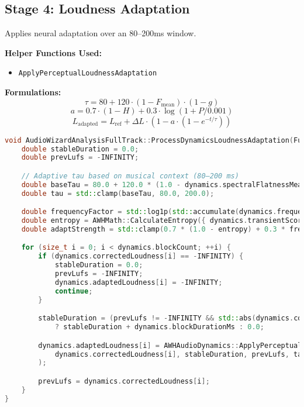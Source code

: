\documentclass[11pt]{article}
\begin{document}
\subsection{Stage 4: Loudness Adaptation}
Applies neural adaptation over an 80--200ms window.

\textbf{Helper Functions Used:}
\begin{itemize}
  \item \texttt{ApplyPerceptualLoudnessAdaptation}
\end{itemize}

\textbf{Formulations:}
\begin{equation}
\tau = 80 + 120 \cdot (1 - F_{\text{mean}}) \cdot (1 - g)
\end{equation}
\begin{equation}
a = 0.7 \cdot (1 - H) + 0.3 \cdot \log(1 + P / 0.001)
\end{equation}
\begin{equation}
L_{\text{adapted}} = L_{\text{ref}} + \Delta L \cdot (1 - a \cdot (1 - e^{-t/\tau}))
\end{equation}

\begin{lstlisting}[language=C++]
void AudioWizardAnalysisFullTrack::ProcessDynamicsLoudnessAdaptation(FullTrackDataDynamics& dynamics) {
	double stableDuration = 0.0;
	double prevLufs = -INFINITY;

	// Adaptive tau based on musical context (80–200 ms)
	double baseTau = 80.0 + 120.0 * (1.0 - dynamics.spectralFlatnessMean) * (1.0 - dynamics.genreFactor);
	double tau = std::clamp(baseTau, 80.0, 200.0);

	double frequencyFactor = std::log1p(std::accumulate(dynamics.frequencyPowers.begin(), dynamics.frequencyPowers.end(), 0.0) / (dynamics.blockCount + 1e-12) / 0.001);
	double entropy = AWHMath::CalculateEntropy({ dynamics.transientScore, dynamics.spectralFlatnessMean, dynamics.spectralFluxMean });
	double adaptStrength = std::clamp(0.7 * (1.0 - entropy) + 0.3 * frequencyFactor, 0.0, 1.0) * dynamics.varianceScale;

	for (size_t i = 0; i < dynamics.blockCount; ++i) {
		if (dynamics.correctedLoudness[i] == -INFINITY) {
			stableDuration = 0.0;
			prevLufs = -INFINITY;
			dynamics.adaptedLoudness[i] = -INFINITY;
			continue;
		}

		stableDuration = (prevLufs != -INFINITY && std::abs(dynamics.correctedLoudness[i] - prevLufs) < 1.5)
			? stableDuration + dynamics.blockDurationMs : 0.0;

		dynamics.adaptedLoudness[i] = AWHAudioDynamics::ApplyPerceptualLoudnessAdaptation(
			dynamics.correctedLoudness[i], stableDuration, prevLufs, tau, adaptStrength
		);

		prevLufs = dynamics.correctedLoudness[i];
	}
}
\end{lstlisting}
\end{document}
